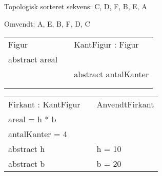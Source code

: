 \begin{frame}[fragile] 
 Topologisk sorteret sekvens: C, D, F, B, E, A
 
 	\begin{figure}[ht]
  \begin{center}
  \end{center}
  \label{fig:topological}
\end{figure}

 Omvendt: A, E, B, F, D, C
\end{frame}


\begin{frame}[fragile] 
\begin{table}[h]
\begin{tabular}{|l|l|l|}
 \cline{1-1} \cline{3-3} 
Figur          &  & KantFigur : Figur    \\ \cline{1-1} \cline{3-3} 
abstract areal &  &                      \\
               &  & abstract antalKanter \\
               &  &                      \\
               &  &                      \\ \cline{1-1} \cline{3-3} 
\end{tabular}
\end{table}
\begin{table}[h]
\begin{tabular}{|l|l|l|}
 \cline{1-1} \cline{3-3} 
Firkant : KantFigur &  & AnvendtFirkant       \\ \cline{1-1} \cline{3-3} 
areal = h * b       &  &                      \\
antalKanter = 4     &  &                      \\
abstract h          &  & h = 10               \\
abstract b          &  & b = 20               \\ \cline{1-1} \cline{3-3} 
\end{tabular}
\end{table}
\end{frame}

